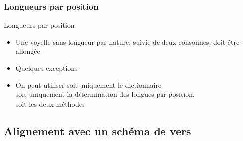 \documentclass{beamer}
\begin{document}
\subsubsection{Longueurs par position}

\begin{frame}{Longueurs par position}

\begin{itemize}
\item Une voyelle sans longueur par nature, suivie de deux consonnes, doit être allongée
\item Quelques exceptions
\vfill
\item On peut utiliser soit uniquement le dictionnaire,\\ soit uniquement la détermination des longues par position,\\ soit les deux méthodes
\end{itemize}
\end{frame} %


\subsection{Alignement avec un schéma de vers}
\end{document}
